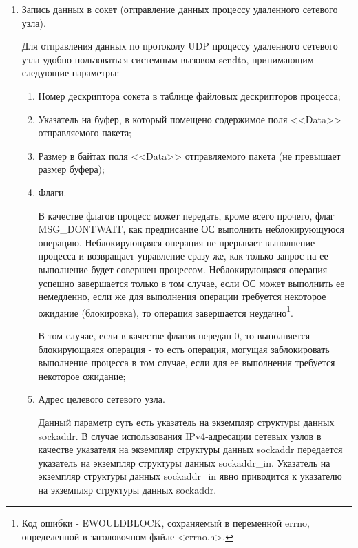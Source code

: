 \begin{enumerate}
			Системный вызов bind возвращает 0 в случае успешной привязки сокета к порту и -1 в случае неудачного завершения означенной операции.

			Библиотека GLIBC предоставляет обертку для данного системного вызова, для использования которой необходимо включить в файл исходного кода программы
			заголовочные файлы <sys/types.h> и <sys/socket.h>;

		\item Запись данных в сокет (отправление данных процессу удаленного сетевого узла).

			Для отправления данных по протоколу UDP процессу удаленного сетевого узла удобно пользоваться системным вызовом sendto, принимающим следующие
			параметры:

			\begin{enumerate}

				\item Номер дескриптора сокета в таблице файловых дескрипторов процесса;
				\item Указатель на буфер, в который помещено содержимое поля <<Data>> отправляемого пакета;
				\item Размер в байтах поля <<Data>> отправляемого пакета (не превышает размер буфера);
				\item Флаги.

					В качестве флагов процесс может передать, кроме всего прочего, флаг \linebreak MSG\_DONTWAIT, как предписание ОС выполнить неблокирующуюся
					операцию. Неблокирующаяся операция не прерывает выполнение процесса и возвращает управление сразу же, как только запрос на ее выполнение
					будет совершен процессом. Неблокирующаяся операция успешно завершается только в том случае, если ОС может выполнить ее немедленно, если же
					для выполнения операции требуется некоторое ожидание (блокировка), то операция завершается неудачно\footnote{Код ошибки - EWOULDBLOCK,
					сохраняемый в переменной errno, определенной в заголовочном файле <errno.h>.}.

					В том случае, если в качестве флагов передан 0, то выполняется блокирующаяся операция -
					то есть операция, могущая заблокировать выполнение процесса в том случае, если для ее выполнения требуется некоторое ожидание;
					
				\item Адрес целевого сетевого узла.

				Данный параметр суть есть указатель на экземпляр структуры данных sockaddr. В случае использования
				IPv4-адресации сетевых узлов в качестве указателя на экземпляр структуры данных sockaddr передается
				указатель на экземпляр структуры данных sockaddr\_in. Указатель на экземпляр структуры данных
				sockaddr\_in явно приводится к указателю на экземпляр структуры данных sockaddr.


\end{enumerate}
\end{enumerate}

